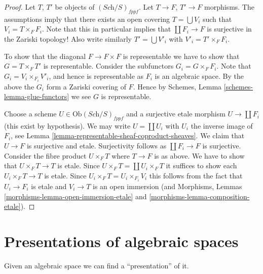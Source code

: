 \begin{proof}
Let $T$, $T'$ be objects of $(\textit{Sch}/S)_{fppf}$.
Let $T \to F$, $T' \to F$ morphisms.
The assumptions imply that there exists an open covering
$T = \bigcup V_i$ such that $V_i = T \times_F F_i$.
Note that this in particular implies that
$\coprod F_i \to F$ is surjective in the Zariski topology!
Also write similarly $T' = \bigcup V'_i$ with $V'_i = T' \times_F F_i$.

\medskip\noindent
To show that the diagonal $F \to F \times F$ is representable
we have to show that $G = T \times_F T'$ is representable.
Consider the subfunctors $G_i = G \times_F F_i$.
Note that $G_i = V_i \times_{F_i} V'_i$, and hence is representable
as $F_i$ is an algebraic space.
By the above the $G_i$ form a Zariski covering of $F$.
Hence by Schemes, Lemma \ref{schemes-lemma-glue-functors}
we see $G$ is representable.

\medskip\noindent
Choose a scheme $U \in \text{Ob}(\textit{Sch}/S)_{fppf}$
and a surjective
etale morphism $U \to \coprod F_i$ (this exist by hypothesis).
We may write $U = \coprod U_i$ with $U_i$ the inverse image of $F_i$,
see Lemma \ref{lemma-representable-sheaf-coproduct-sheaves}.
We claim that $U \to F$ is surjective and
etale. Surjectivity follows as $\coprod F_i \to F$ is surjective.
Consider the fibre product $U \times_F T$ where $T \to F$ is as
above. We have to show that $U \times_F T \to T$ is etale.
Since $U \times_F T = \coprod U_i \times_F T$ it suffices to show
each $U_i \times_F T \to T$ is etale. Since
$U_i \times_F T = U_i \times_{F_i} V_i$ this follows from the
fact that $U_i \to F_i$ is etale and $V_i \to T$ is an open immersion
(and Morphisms, Lemmas \ref{morphisms-lemma-open-immersion-etale}
and \ref{morphisms-lemma-composition-etale}).
\end{proof}














\section{Presentations of algebraic spaces}
\label{section-presentations}

\noindent
Given an algebraic space we can find a ``presentation'' of it.


